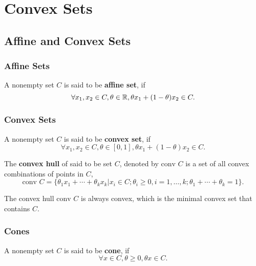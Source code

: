 \chapter{Convex Sets}

\section{Affine and Convex Sets}

\subsection{Affine Sets}

\begin{definition}
	A nonempty set $C$ is said to be \textbf{affine set}, if $$\forall x_1,x_2\in C, \theta\in{\mathbb R}, \theta x_1+(1-\theta)x_2\in C.$$
\end{definition}

\subsection{Convex Sets}

\begin{definition}
	A nonempty set $C$ is said to be \textbf{convex set}, if $$\forall x_1,x_2\in C,\theta\in[0,1], \theta x_1+(1-\theta)x_2\in C.$$
\end{definition}

\begin{definition}
	The \textbf{convex hull} of said to be set $C$, denoted by $\text{conv } C$ is a set of all convex combinations of points in $C$, $$\text{conv } C=\{\theta_1x_1+\cdots+\theta_kx_k|x_i\in C;\theta_i\geq 0,i=1,\ldots,k;\theta_1+\cdots+\theta_k=1\}.$$
\end{definition}

\begin{remark}
	The convex hull $\text{conv } C$ is always convex, which is the minimal convex set that contains $C$.
\end{remark}

\subsection{Cones}

\begin{definition}[Cone]
	A nonempty set $C$ is said to be \textbf{cone}, if $$\forall x\in C,\theta\geq 0,\theta x\in C.$$
\end{definition}

